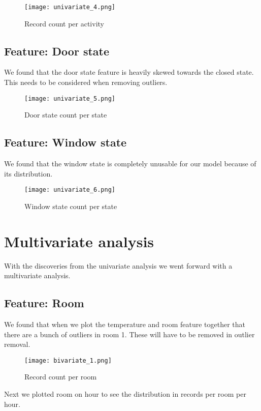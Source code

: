 \documentclass[]{article}
\begin{document}
\begin{figure}[H]
	\centering
	\texttt{[image: univariate\_4.png]}
	\caption{Record count per activity}
\end{figure}

\subsection{Feature: Door state}
We found that the door state feature is heavily skewed towards the closed state. This needs to be considered when removing outliers.

\begin{figure}[H]
	\centering
	\texttt{[image: univariate\_5.png]}
	\caption{Door state count per state}
\end{figure}

\subsection{Feature: Window state}
We found that the window state is completely unusable for our model because of its distribution.

\begin{figure}[H]
	\centering
	\texttt{[image: univariate\_6.png]}
	\caption{Window state count per state}
\end{figure}



\section{Multivariate analysis}
With the discoveries from the univariate analysis we went forward with a multivariate analysis. 

\subsection{Feature: Room}
We found that when we plot the temperature and room feature together that there are a bunch of outliers in room 1. These will have to be removed in outlier removal.

\begin{figure}[H]
	\centering
	\texttt{[image: bivariate\_1.png]}
	\caption{Record count per room}
\end{figure}

Next we plotted room on hour to see the distribution in records per room per hour.
\end{document}
